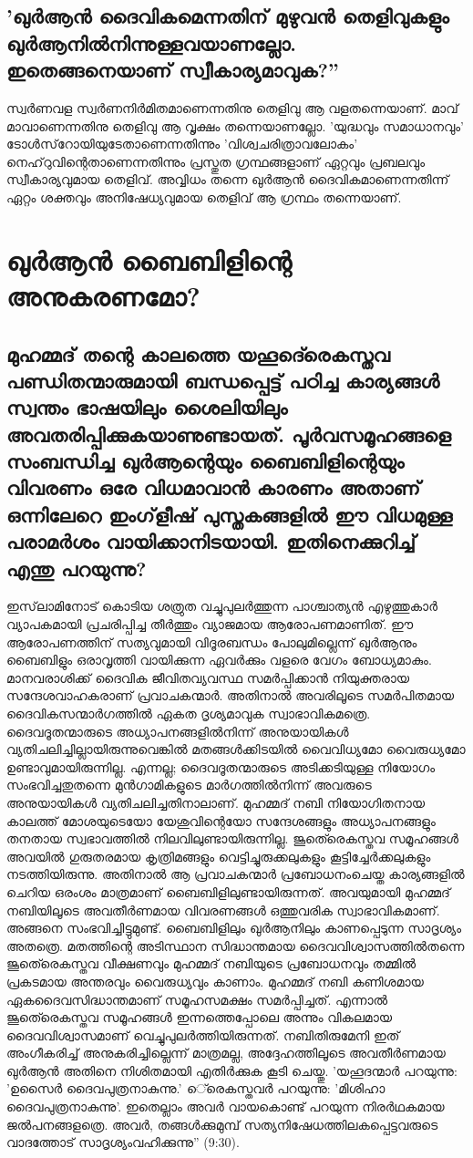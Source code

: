\section{'ഖുര്‍ആന്‍ ദൈവികമെന്നതിന് മുഴുവന്‍ തെളിവുകളും ഖുര്‍ആനില്‍നിന്നുള്ളവയാണല്ലോ. ഇതെങ്ങനെയാണ് സ്വീകാര്യമാവുക?''}
സ്വര്‍ണവള സ്വര്‍ണനിര്‍മിതമാണെന്നതിനു തെളിവു ആ വളതന്നെയാണ്. മാവ് മാവാണെന്നതിനു തെളിവു ആ വൃക്ഷം തന്നെയാണല്ലോ. 'യുദ്ധവും സമാധാനവും' ടോള്‍സ്‌റോയിയുടേതാണെന്നതിന്നും 'വിശ്വചരിത്രാവലോകം' നെഹ്‌റുവിന്റെതാണെന്നതിന്നും പ്രസ്തുത ഗ്രന്ഥങ്ങളാണ് ഏറ്റവും പ്രബലവും സ്വീകാര്യവുമായ തെളിവ്. അവ്വിധം തന്നെ ഖുര്‍ആന്‍ ദൈവികമാണെന്നതിന്ന് ഏറ്റം ശക്തവും അനിഷേധ്യവുമായ തെളിവ് ആ ഗ്രന്ഥം തന്നെയാണ്.
\chapter{ഖുര്‍ആന്‍ ബൈബിളിന്റെ അനുകരണമോ? }
 \section{ മുഹമ്മദ് തന്റെ കാലത്തെ യഹൂദെ്രെകസ്തവ പണ്ഡിതന്മാരുമായി ബന്ധപ്പെട്ട് പഠിച്ച കാര്യങ്ങള്‍ സ്വന്തം ഭാഷയിലും ശൈലിയിലും അവതരിപ്പിക്കുകയാണുണ്ടായത്. പൂര്‍വസമൂഹങ്ങളെ സംബന്ധിച്ച ഖുര്‍ആന്റെയും ബൈബിളിന്റെയും വിവരണം ഒരേ വിധമാവാന്‍ കാരണം അതാണ് ഒന്നിലേറെ ഇംഗ്‌ളീഷ് പുസ്തകങ്ങളില്‍ ഈ വിധമുള്ള പരാമര്‍ശം വായിക്കാനിടയായി. ഇതിനെക്കുറിച്ച് എന്തു പറയുന്നു?}
ഇസ്‌ലാമിനോട് കൊടിയ ശത്രുത വച്ചുപുലര്‍ത്തുന്ന പാശ്ചാത്യന്‍ എഴുത്തുകാര്‍ വ്യാപകമായി പ്രചരിപ്പിച്ച തീര്‍ത്തും വ്യാജമായ ആരോപണമാണിത്. ഈ ആരോപണത്തിന് സത്യവുമായി വിദൂരബന്ധം പോലുമില്ലെന്ന് ഖുര്‍ആനും ബൈബിളും ഒരാവൃത്തി വായിക്കുന്ന ഏവര്‍ക്കും വളരെ വേഗം ബോധ്യമാകും.
മാനവരാശിക്ക് ദൈവിക ജീവിതവ്യവസ്ഥ സമര്‍പ്പിക്കാന്‍ നിയുക്തരായ സന്ദേശവാഹകരാണ് പ്രവാചകന്മാര്‍. അതിനാല്‍ അവരിലൂടെ സമര്‍പിതമായ ദൈവികസന്മാര്‍ഗത്തില്‍ ഏകത ദൃശ്യമാവുക സ്വാഭാവികമത്രെ. ദൈവദൂതന്മാരുടെ അധ്യാപനങ്ങളില്‍നിന്ന് അനുയായികള്‍ വ്യതിചലിച്ചില്ലായിരുന്നുവെങ്കില്‍ മതങ്ങള്‍ക്കിടയില്‍ വൈവിധ്യമോ വൈരുധ്യമോ ഉണ്ടാവുമായിരുന്നില്ല. എന്നല്ല; ദൈവദൂതന്മാരുടെ അടിക്കടിയുള്ള നിയോഗം സംഭവിച്ചതുതന്നെ മുന്‍ഗാമികളുടെ മാര്‍ഗത്തില്‍നിന്ന് അവരുടെ അനുയായികള്‍ വ്യതിചലിച്ചതിനാലാണ്.
മുഹമ്മദ് നബി നിയോഗിതനായ കാലത്ത് മോശയുടെയോ യേശുവിന്റെയോ സന്ദേശങ്ങളും അധ്യാപനങ്ങളും തനതായ സ്വഭാവത്തില്‍ നിലവിലുണ്ടായിരുന്നില്ല. ജൂതെ്രെകസ്തവ സമൂഹങ്ങള്‍ അവയില്‍ ഗുരുതരമായ കൃത്രിമങ്ങളും വെട്ടിച്ചുരുക്കലുകളും കൂട്ടിച്ചേര്‍ക്കലുകളും നടത്തിയിരുന്നു. അതിനാല്‍ ആ പ്രവാചകന്മാര്‍ പ്രബോധനംചെയ്ത കാര്യങ്ങളില്‍ ചെറിയ ഒരംശം മാത്രമാണ് ബൈബിളിലുണ്ടായിരുന്നത്. അവയുമായി മുഹമ്മദ് നബിയിലൂടെ അവതീര്‍ണമായ വിവരണങ്ങള്‍ ഒത്തുവരിക സ്വാഭാവികമാണ്. അങ്ങനെ സംഭവിച്ചിട്ടുമുണ്ട്. ബൈബിളിലും ഖുര്‍ആനിലും കാണപ്പെടുന്ന സാദൃശ്യം അതത്രെ.
മതത്തിന്റെ അടിസ്ഥാന സിദ്ധാന്തമായ ദൈവവിശ്വാസത്തില്‍തന്നെ ജൂതെ്രെകസ്തവ വീക്ഷണവും മുഹമ്മദ് നബിയുടെ പ്രബോധനവും തമ്മില്‍ പ്രകടമായ അന്തരവും വൈരുധ്യവും കാണാം. മുഹമ്മദ് നബി കണിശമായ ഏകദൈവസിദ്ധാന്തമാണ് സമൂഹസമക്ഷം സമര്‍പ്പിച്ചത്. എന്നാല്‍ ജൂതെ്രെകസ്തവ സമൂഹങ്ങള്‍ ഇന്നത്തെപ്പോലെ അന്നും വികലമായ ദൈവവിശ്വാസമാണ് വെച്ചുപുലര്‍ത്തിയിരുന്നത്. നബിതിരുമേനി ഇത് അംഗീകരിച്ച് അനുകരിച്ചില്ലെന്ന് മാത്രമല്ല, അദ്ദേഹത്തിലൂടെ അവതീര്‍ണമായ ഖുര്‍ആന്‍ അതിനെ നിശിതമായി എതിര്‍ക്കുക കൂടി ചെയ്തു. 'യഹൂദന്മാര്‍ പറയുന്നു: 'ഉസൈര്‍ ദൈവപുത്രനാകുന്നു.' െ്രെകസ്തവര്‍ പറയുന്നു: 'മിശിഹാ ദൈവപുത്രനാകുന്നു'. ഇതെല്ലാം അവര്‍ വായകൊണ്ട് പറയുന്ന നിരര്‍ഥകമായ ജല്‍പനങ്ങളത്രെ. അവര്‍, തങ്ങള്‍ക്കുമുമ്പ് സത്യനിഷേധത്തിലകപ്പെട്ടവരുടെ വാദത്തോട് സാദൃശ്യംവഹിക്കുന്നു'' (9:30).
